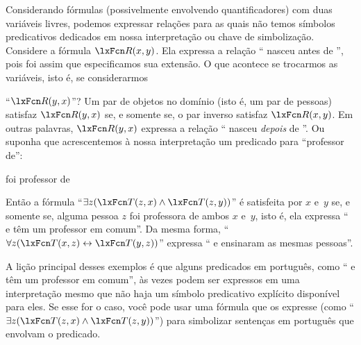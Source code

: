 Considerando fórmulas (possivelmente envolvendo quantificadores) com duas variáveis livres, podemos expressar relações para as quais não temos símbolos predicativos dedicados em nossa interpretação ou chave de simbolização. Considere a fórmula $\atom{R}{x,y}$. Ela expressa a relação \textquotedblleft {} nasceu antes de \textquotedblright{}, pois foi assim que especificamos sua extensão. O que acontece se trocarmos as variáveis, isto é, se considerarmos




\textquotedblleft $\atom{R}{y,x}$\textquotedblright{}? Um par de objetos  no
domínio (isto é, um par de pessoas) satisfaz $\atom{R}{y,x}$ se, e somente se,
o par inverso  satisfaz
$\atom{R}{x,y}$. Em outras palavras, $\atom{R}{y,x}$ expressa
a relação \textquotedblleft {} nasceu \emph{depois} de \textquotedblright{}. Ou suponha que acrescentemos à nossa interpretação um predicado para \textquotedblleft professor de\textquotedblright{}:


\begin{ekey}
\item[\atom{T}{x,y}]  foi professor de 
\end{ekey}
Então a fórmula \textquotedblleft $\exists z(\atom{T}{z,x} \land \atom{T}{z,y})$\textquotedblright{} é satisfeita por $x$ e~$y$ se, e somente se, alguma pessoa $z$ foi professora de ambos $x$ e~$y$, isto é, ela expressa \textquotedblleft {} e  têm um professor em comum\textquotedblright{}. Da mesma forma, \textquotedblleft $\forall z(\atom{T}{x,z} \eiff \atom{T}{y,z})$\textquotedblright{} expressa \textquotedblleft {} e  ensinaram as mesmas pessoas\textquotedblright{}.





A lição principal desses exemplos é que alguns predicados em português, como \textquotedblleft {} e  têm um professor em comum\textquotedblright{}, às vezes podem ser expressos em uma interpretação mesmo que não haja um símbolo predicativo explícito disponível para eles. Se esse for o caso, você pode usar uma fórmula que os expresse (como \textquotedblleft $\exists z(\atom{T}{z,x} \land \atom{T}{z,y})$\textquotedblright{}) para simbolizar sentenças em português que envolvam o predicado.







\practiceproblems

